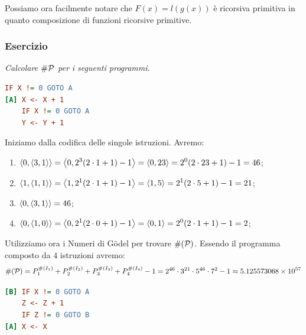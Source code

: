 Possiamo ora facilmente notare che \(F(x) = l(g(x))\) è ricorsiva primitiva in quanto composizione di funzioni ricorsive primitive.

\subsubsection*{Esercizio} \textit{Calcolare \(\#\mathcal{P}\) per i seguenti programmi.}
\begin{lstlisting}[language=ini, label={Codifica 1 es}, caption= Esercizio Codifica Programmi 1]
    IF X != 0 GOTO A
[A] X <- X + 1
    IF X != 0 GOTO A
    Y <- Y + 1
\end{lstlisting}

Iniziamo dalla codifica delle singole istruzioni. Avremo:
\begin{enumerate}
    \item \(\displaystyle{\left\langle{ 0,\displaystyle{\left\langle{ 3,1}\right\rangle}}\right\rangle}= \displaystyle{\left\langle{ 0,2^3(2\cdot 1 +1)-1}\right\rangle} = \displaystyle{\left\langle{ 0,23}\right\rangle} = 2^0(2\cdot 23 + 1) - 1 = 46\);
    \item \(\displaystyle{\left\langle{ 1,\displaystyle{\left\langle{ 1,1}\right\rangle}}\right\rangle}= \displaystyle{\left\langle{ 1,2^1(2\cdot 1 +1)-1}\right\rangle} = \displaystyle{\left\langle{ 1,5}\right\rangle} = 2^1(2\cdot 5 + 1) - 1 = 21\);
    \item \(\displaystyle{\left\langle{ 0,\displaystyle{\left\langle{ 3,1}\right\rangle}}\right\rangle}= 46\);
    \item \(\displaystyle{\left\langle{ 0,\displaystyle{\left\langle{ 1,0}\right\rangle}}\right\rangle}= \displaystyle{\left\langle{ 0,2^1(2\cdot 0 +1)-1}\right\rangle} = \displaystyle{\left\langle{ 0,1}\right\rangle} = 2^0(2\cdot 1 + 1) - 1 = 2\);
\end{enumerate}
Utilizziamo ora i Numeri di Gödel per trovare \(\# (\mathcal{P})\). Essendo il programma composto da \(4\) istruzioni avremo:
\begin{equation}
    \# (\mathcal{P}) = P_1^{\# (I_1)} + P_2^{\# (I_2)} + P_3^{\# (I_3)} + P_4^{\# (I_4)}-1= 2^{46} \cdot 3^{21} \cdot 5^{46} \cdot 7^2 - 1\approx 5.125573068 \times  10^{57}
\end{equation}

\begin{lstlisting}[language=ini, label={Codifica 2 es},  caption= Esercizio Codifica Programmi 1]
[B] IF X != 0 GOTO A
    Z <- Z + 1
    IF Z != 0 GOTO B
[A] X <- X
\end{lstlisting}

